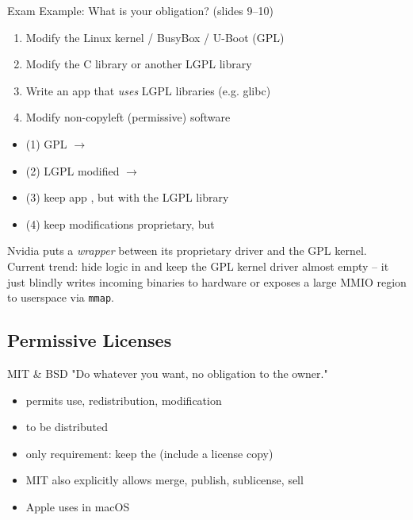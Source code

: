\begin{example2}{Exam Example: What is your obligation? (slides 9--10)}
    \begin{enumerate}
        \item Modify the Linux kernel / BusyBox / U-Boot (GPL)
        \item Modify the C library or another LGPL library
        \item Write an app that \emph{uses} LGPL libraries (e.g. glibc)
        \item Modify non-copyleft (permissive) software
    \end{enumerate}
    \tcblower
    \begin{itemize}
        \item (1) GPL $\to$ 
        \item (2) LGPL modified $\to$ 
        \item (3) keep app , but 
              with the LGPL library
        \item (4) keep modifications proprietary, but 
    \end{itemize}
\end{example2}

\begin{remark}
     Nvidia puts a \emph{wrapper} between its
    proprietary driver and the GPL kernel. Current trend: hide logic in
     and keep the GPL kernel driver almost empty --
    it just blindly writes incoming binaries to hardware or exposes a large MMIO
    region to userspace via \texttt{mmap}.
\end{remark}

\subsection{Permissive Licenses}


\begin{definition}{MIT \& BSD}
    "Do whatever you want, no obligation to the owner."
    \begin{itemize}
        \item permits use, redistribution, modification
        \item {} to be distributed
        \item only requirement: keep the  (include a license copy)
        \item MIT also explicitly allows merge, publish, sublicense, sell
        \item Apple uses  in macOS
    \end{itemize}
\end{definition}

